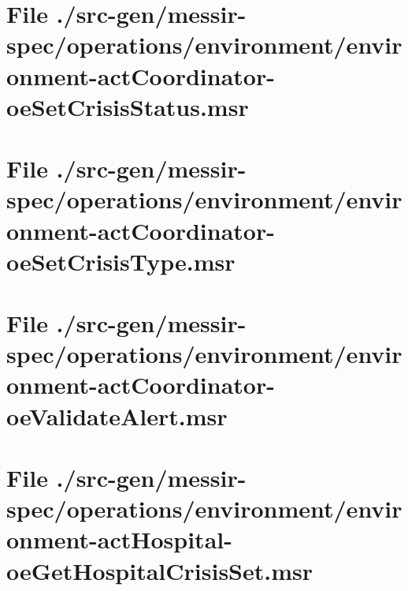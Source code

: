 \section[File /src-gen/messir-spec.../environment-actCoordinator-oeSetCrisisStatus.msr]{File ./src-gen/messir-spec/operations/environment/environment-actCoordinator-oeSetCrisisStatus.msr}
\scriptsize

\normalsize
	
\section[File /src-gen/messir-spec.../environment-actCoordinator-oeSetCrisisType.msr]{File ./src-gen/messir-spec/operations/environment/environment-actCoordinator-oeSetCrisisType.msr}
\scriptsize

\normalsize
	
\section[File /src-gen/messir-spec.../environment-actCoordinator-oeValidateAlert.msr]{File ./src-gen/messir-spec/operations/environment/environment-actCoordinator-oeValidateAlert.msr}
\scriptsize

\normalsize
	
\section[File /src-gen/messir-spec.../environment-actHospital-oeGetHospitalCrisisSet.msr]{File ./src-gen/messir-spec/operations/environment/environment-actHospital-oeGetHospitalCrisisSet.msr}
\scriptsize

\normalsize
	
